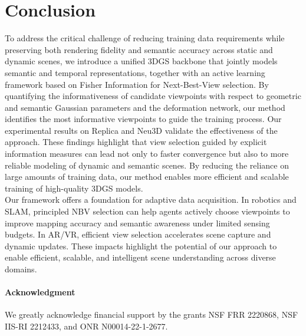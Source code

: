 \section{Conclusion}
To address the critical challenge of reducing training data requirements while preserving both rendering fidelity and semantic accuracy across static and dynamic scenes, we introduce a unified 3DGS backbone that jointly models semantic and temporal representations, together with an active learning framework based on Fisher Information for Next-Best-View selection. By quantifying the informativeness of candidate viewpoints with respect to geometric and semantic Gaussian parameters and the deformation network, our method identifies the most informative viewpoints to guide the training process. Our experimental results on Replica and Neu3D validate the effectiveness of the approach. These findings highlight that view selection guided by explicit information measures can lead not only to faster convergence but also to more reliable modeling of dynamic and semantic scenes. By reducing the reliance on large amounts of training data, our method enables more efficient and scalable training of high-quality 3DGS models.\\
Our framework offers a foundation for adaptive data acquisition. In robotics and SLAM, principled NBV selection can help agents actively choose viewpoints to improve mapping accuracy and semantic awareness under limited sensing budgets. In AR/VR, efficient view selection accelerates scene capture and dynamic updates. These impacts highlight the potential of our approach to enable efficient, scalable, and intelligent scene understanding across diverse domains.

\paragraph{Acknowledgment}
We greatly acknowledge financial support by the grants NSF FRR
2220868, NSF IIS-RI 2212433, and ONR N00014-22-1-2677.

